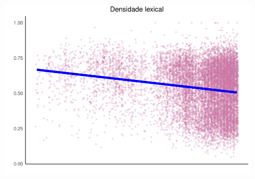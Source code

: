 \documentclass[]{article}
\begin{document}
\includegraphics{avaliacaoLetrasDeForro_files/figure-latex/unnamed-chunk-9-1.pdf}
\end{document}
